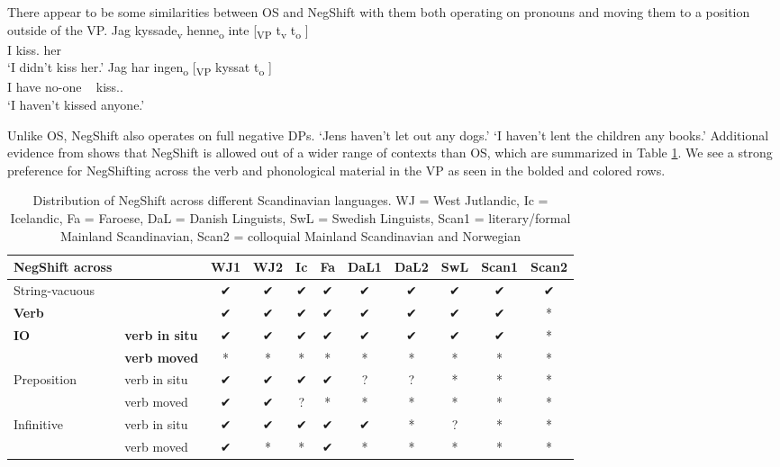 \documentclass[12pt, letterpaper]{article}
\begin{document}
\ea There appear to be some similarities between OS and NegShift with them both operating on pronouns and moving them to a position outside of the VP. 
	\ea \label{ex:OS}
		\gll Jag kyssade\textsubscript{v} henne\textsubscript{o} inte [\textsubscript{VP} t\textsubscript{v} t\textsubscript{o} ] \\
		I kiss.\Pst{} her \Neg{}\\
		\glt `I didn't kiss her.'
	\ex \label{ex:NS}
		\gll Jag har ingen\textsubscript{o} [\textsubscript{VP} kyssat t\textsubscript{o} ]\\
		I have no-one ~ kiss.\Pst{}.\Ptcp{} \\
		\glt `I haven't kissed anyone.'
	\z 
	
\ex Unlike OS, NegShift also operates on full negative DPs.
			\glt `Jens haven't let out any dogs.'
			\glt `I haven't lent the children any books.'
		\z
\ex Additional evidence from \citet{engelsScandinavianNegativeIndefinites2012} shows that NegShift is allowed out of a wider range of contexts than OS, which are summarized in Table \ref{tab:Distribution}.
	\ea We see a strong preference for NegShifting across the verb and phonological material in the VP as seen in the bolded and colored rows. 
	\ex 
	\z 
\begin{table}[!ht]
	\centering
	\caption{Distribution of NegShift across different Scandinavian languages. WJ = West Jutlandic, Ic = Icelandic, Fa = Faroese, DaL = Danish Linguists, SwL = Swedish Linguists, Scan1 = literary/formal Mainland Scandinavian, Scan2 = colloquial Mainland Scandinavian and Norwegian}
	\label{tab:Distribution}
\begin{tabular}{llccccccccc}
	\hline 
	NegShift across &  & WJ1 & WJ2 & Ic & Fa & DaL1 & DaL2 & SwL & Scan1 & Scan2 \\ 
	\hline 
	String-vacuous &  & ✔︎ & ✔︎ & ✔︎ & ✔︎ & ✔︎ & ✔︎ & ✔︎ & ✔︎ & ✔︎ \\ 
	\textbf{Verb} &  & ✔︎ & ✔︎ & ✔︎ & ✔︎ & ✔︎ & ✔︎ & ✔︎ & ✔︎ & * \\ 
	\textbf{IO} & \textbf{verb in situ} & ✔︎ & ✔︎ & ✔︎ & ✔︎ & ✔︎ & ✔︎ & ✔︎ & ✔︎ & * \\ 
	& \textbf{verb moved} & * & * & * & * & * & * & * & * & * \\ 
	Preposition & verb in situ & ✔︎ & ✔︎ & ✔︎ & ✔︎ & ? & ? & * & * & * \\ 
	& verb moved & ✔︎ & ✔︎ & ? & * & * & * & * & * & * \\ 
	Infinitive & verb in situ & ✔︎ & ✔︎ & ✔︎ & ✔︎ & ✔︎ & * & ? & * & * \\ 
	& verb moved & ✔︎ & * & * & ✔︎ & * & * & * & * & * \\ 
	\hline 
\end{tabular} 
\end{table}
\z
\end{document}
